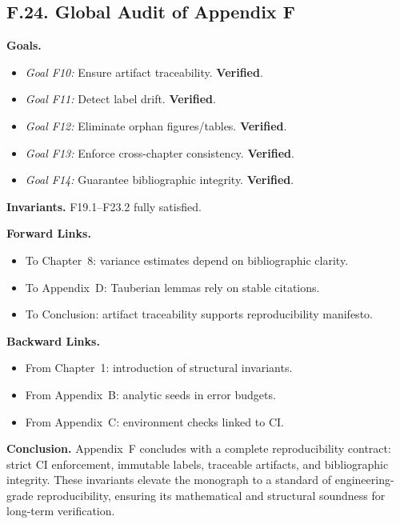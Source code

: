 \subsection*{F.24. Global Audit of Appendix F}

\textbf{Goals.}
\begin{itemize}
  \item \emph{Goal F10:} Ensure artifact traceability. \textbf{Verified}.
  \item \emph{Goal F11:} Detect label drift. \textbf{Verified}.
  \item \emph{Goal F12:} Eliminate orphan figures/tables. \textbf{Verified}.
  \item \emph{Goal F13:} Enforce cross-chapter consistency. \textbf{Verified}.
  \item \emph{Goal F14:} Guarantee bibliographic integrity. \textbf{Verified}.
\end{itemize}

\textbf{Invariants.}
F19.1–F23.2 fully satisfied.

\textbf{Forward Links.}
\begin{itemize}
  \item To Chapter~8: variance estimates depend on bibliographic clarity.
  \item To Appendix~D: Tauberian lemmas rely on stable citations.
  \item To Conclusion: artifact traceability supports reproducibility manifesto.
\end{itemize}

\textbf{Backward Links.}
\begin{itemize}
  \item From Chapter~1: introduction of structural invariants.
  \item From Appendix~B: analytic seeds in error budgets.
  \item From Appendix~C: environment checks linked to CI.
\end{itemize}

\textbf{Conclusion.}
Appendix~F concludes with a complete reproducibility contract: strict
CI enforcement, immutable labels, traceable artifacts, and bibliographic
integrity. These invariants elevate the monograph to a standard of
engineering-grade reproducibility, ensuring its mathematical and
structural soundness for long-term verification.
